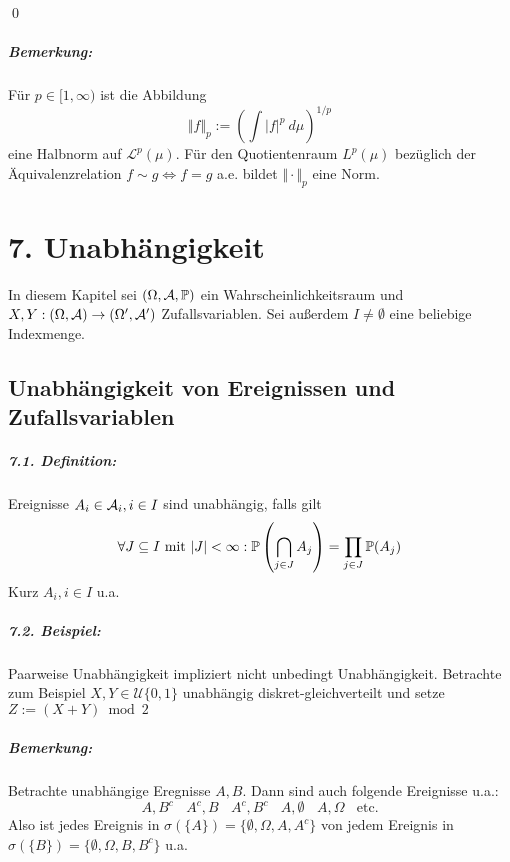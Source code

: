 \documentclass[12pt]{report}
\begin{document}
 \qed
 
 \paragraph{Bemerkung:}F\"ur $p\in[1,\infty)$ ist die Abbildung
 $$\Vert f\Vert_p:=\left(\int |f|^p\ d\mu\right)^{1/p}$$
eine Halbnorm auf $\mathcal{L}^p(\mu)$. F\"ur den Quotientenraum $L^p(\mu)$ bez\"uglich der \"Aquivalenzrelation $f\sim g\iff f=g$ a.e. bildet $\Vert\cdot \Vert_p$ eine Norm.
 
\chapter*{7. Unabh\"angigkeit}

In diesem Kapitel sei $(\Omega, \mathcal{A}, \mathbb{P})$ ein Wahrscheinlichkeitsraum und $X,Y:(\Omega,\mathcal{A})\to(\Omega',\mathcal{A}')$ Zufallsvariablen. Sei au\ss{}erdem $I\neq\emptyset$ eine beliebige Indexmenge. 
 
\section*{Unabh\"angigkeit von Ereignissen und Zufallsvariablen}
 
\paragraph{7.1. Definition:}Ereignisse $A_i\in\mathcal{A}_i,i\in I$ sind unabh\"angig, falls gilt
$$\forall J\subseteq I\text{ mit }|J|<\infty:\mathbb{P}\left(\bigcap_{j\in J}A_j\right)=\prod_{j\in J}\mathbb{P}(A_j)$$ 
Kurz $A_i,i\in I$ u.a.

\paragraph{7.2. Beispiel:}Paarweise Unabh\"angigkeit impliziert nicht unbedingt Unabh\"angigkeit. Betrachte zum Beispiel $X,Y\in \mathcal{U}\{0,1\}$ unabh\"angig diskret-gleichverteilt und setze $Z:=(X+Y)\bmod 2$
 
\paragraph{Bemerkung:}Betrachte unabh\"angige Eregnisse $A,B$. Dann sind auch folgende Ereignisse u.a.:
$$A,B^c\ \ \ \ A^c,B\ \ \ \ A^c,B^c\ \ \ \ A,\emptyset\ \ \ \ A,\Omega\ \ \ \ \text{etc.}$$
Also ist jedes Ereignis in $\sigma(\{A\})=\{\emptyset,\Omega,A,A^c\}$ von jedem Ereignis in $\sigma(\{B\})=\{\emptyset,\Omega,B,B^c\}$ u.a.
\end{document}
